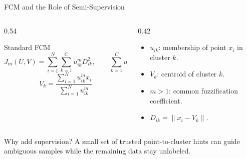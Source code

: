 \documentclass[t,aspectratio=169]{beamer}
\begin{document}
\begin{frame}{FCM and the Role of Semi-Supervision}
  \begin{columns}[T,onlytextwidth]
    \begin{column}{0.54\textwidth}
      \begin{block}{Standard FCM}
        \[
          J_m(U,V)=\sum_{i=1}^{N}\sum_{k=1}^{C}u_{ik}^{m}D_{ik}^{2},
          \qquad \sum_{k=1}^{C}u_{ik}=1
        \]
        \[
          V_k=\frac{\sum_{i=1}^{N}u_{ik}^{m}x_i}
          {\sum_{i=1}^{N}u_{ik}^{m}}
        \]
      \end{block}
    \end{column}
    \begin{column}{0.42\textwidth}
      \begin{itemize}
        \item $u_{ik}$: membership of point $x_i$ in cluster $k$.
        \item $V_k$: centroid of cluster $k$.
        \item $m>1$: common fuzzification coefficient.
        \item $D_{ik}=\lVert x_i-V_k\rVert$.
      \end{itemize}
    \end{column}
  \end{columns}

  \vspace{0.3em}
  \begin{alertblock}{Why add supervision?}
    A small set of trusted point-to-cluster hints can guide ambiguous samples while the remaining data stay unlabeled.
  \end{alertblock}
\end{frame}
\end{document}
